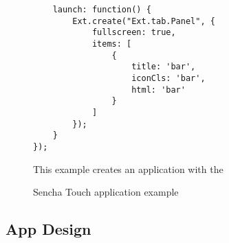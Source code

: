\documentclass[10pt,a4paper]{article}
\begin{document}
\begin{description}
\begin{figure}[h!]
\begin{lstlisting}
    launch: function() {
        Ext.create("Ext.tab.Panel", {
            fullscreen: true,
            items: [
                {
                    title: 'bar',
                    iconCls: 'bar',
                    html: 'bar'
                }
            ]
        });
    }
});
\end{lstlisting}
\caption{Sencha Touch application example}
This example creates an application with the %
\end{figure}
\end{description}


\subsection{App Design}
\end{document}
